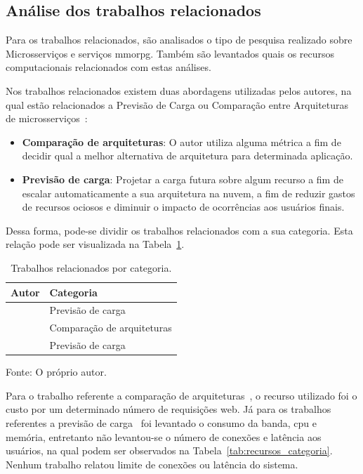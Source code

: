 \subsection{Análise dos trabalhos relacionados}
\label{sec:similares_analise}



Para os trabalhos relacionados, são analisados o tipo de pesquisa realizado sobre Microsserviços e serviços \ac{mmorpg}.
%
Também são levantados quais os recursos computacionais relacionados com estas análises.


Nos trabalhos relacionados existem duas abordagens utilizadas pelos autores, na qual estão relacionados a Previsão de Carga ou Comparação entre Arquiteturas de microsserviços~\cite{7515686, 6374456}:

\begin{itemize}
  \item \textbf{Comparação de arquiteturas}: O autor utiliza alguma métrica a fim de decidir qual a melhor alternativa de arquitetura para determinada aplicação.
  \item \textbf{Previsão de carga}: Projetar a carga futura sobre algum recurso a fim de escalar automaticamente a sua arquitetura na nuvem, a fim de reduzir gastos de recursos ociosos e diminuir o impacto de ocorrências aos usuários finais.
\end{itemize}

Dessa forma, pode-se dividir os trabalhos relacionados com a sua categoria.
%
Esta relação pode ser visualizada na Tabela~\ref{tab:categoria_trabalhos}.

\begin{table}[htb!]
\centering
\caption{Trabalhos relacionados por categoria.}
\label{tab:categoria_trabalhos}
\begin{tabular}{l|l}
\hline
Autor & Categoria                            \\ \hline
\cite{6374456}  & Previsão de carga          \\ \hline
\cite{7515686}  & Comparação de arquiteturas \\ \hline
\cite{1417630}  & Previsão de carga          \\ \hline
\end{tabular}


Fonte: O próprio autor.
\end{table}

Para o trabalho referente a comparação de arquiteturas~\cite{7515686}, o recurso utilizado foi o custo por um determinado número de requisições web.
%
Já para os trabalhos referentes a previsão de carga~\cite{6374456, 1417630} foi levantado o consumo da banda, \ac{cpu} e memória, entretanto não levantou-se o número de conexões e latência aos usuários, na qual podem ser observados na Tabela~\ref{tab:recursos_categoria}.
%
Nenhum trabalho relatou limite de conexões ou latência do sistema.

